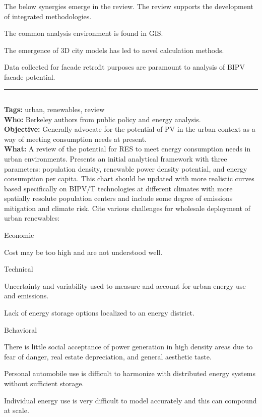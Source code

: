 \documentclass[11pt,a4paper]{article}
\newenvironment{itemize*}%
  {\begin{itemize}[rightmargin=\dimexpr\linewidth-120mm-\leftmargin\relax]%
    \setlength{\itemsep}{0pt}%
    \setlength{\parskip}{0pt}}%
  {\end{itemize}}
\begin{document}
The below synergies emerge in the review. The review supports the development of integrated methodologies. 

\begin{itemize*}
    \item The common analysis environment is found in GIS.
    \item The emergence of 3D city models has led to novel calculation methods.
    \item Data collected for facade retrofit purposes are paramount to analysis of BIPV facade potential.
\end{itemize*}

\noindent\rule{\textwidth}{1pt}
\subsection*{}
\textbf{Tags:} urban, renewables, review \\
\textbf{Who:} Berkeley authors from public policy and energy analysis.  \\
\textbf{Objective:} Generally advocate for the potential of PV in the urban context as a way of meeting consumption needs at present. \\
\textbf{What:} A review of the potential for RES to meet energy consumption needs in urban environments. Presents an initial analytical framework with three parameters: population density, renewable power density potential, and energy consumption per capita. This chart should be updated with more realistic curves based specifically on BIPV/T technologies at different climates with more spatially resolute population centers and include some degree of emissions mitigation and climate risk. Cite various challenges for wholesale deployment of urban renewables:

Economic
\begin{itemize*}
    \item Cost may be too high and are not understood well.
\end{itemize*}

Technical
\begin{itemize*}
    \item Uncertainty and variability used to measure and account for urban energy use and emissions.
    \item Lack of energy storage options localized to an energy district.
\end{itemize*}

Behavioral
\begin{itemize*}
    \item There is little social acceptance of power generation in high density areas due to fear of danger, real estate depreciation, and general aesthetic taste.
    \item Personal automobile use is difficult to harmonize with distributed energy systems without sufficient storage.
    \item Individual energy use is very difficult to model accurately and this can compound at scale.
\end{itemize*}
\end{document}
